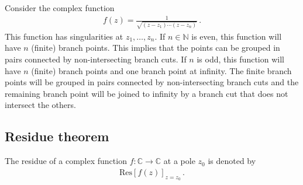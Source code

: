 
    \begin{example}
        Consider the complex function
        \begin{gather}
            f(z) = \frac{1}{\sqrt{(z-z_1)\cdots(z-z_n)}}\,.
        \end{gather}
        This function has singularities at $z_1,\ldots,z_n$. If $n\in\mathbb{N}$ is even, this function will have $n$ (finite) branch points. This implies that the points can be grouped in pairs connected by non-intersecting branch cuts. If $n$ is odd, this function will have $n$ (finite) branch points and one branch point at infinity. The finite branch points will be grouped in pairs connected by non-intersecting branch cuts and the remaining branch point will be joined to infinity by a branch cut that does not intersect the others.
    \end{example}

\subsection{Residue theorem}

    \begin{notation}
        The residue of a complex function $f:\mathbb{C}\rightarrow\mathbb{C}$ at a pole $z_0$ is denoted by
        \begin{gather}
            \mathrm{Res}[f(z)]_{z=z_0}\,.
        \end{gather}
    \end{notation}

